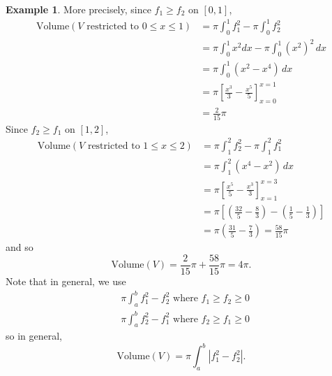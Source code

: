 \documentclass[11pt]{article}
\theoremstyle{definition}
\newtheorem{exmp}[thm]{Example}
\begin{document}
\begin{exmp}
More precisely, since $f_1 \geq f_2$ on $[0, 1]$,
\begin{align*}
\text{Volume}(V \text{ restricted to } 0 \leq x \leq 1) & = \pi \int_0^1 f_1^2 - \pi \int_0^1 f_2^2 \\
& = \pi \int_0^1 x^2dx - \pi \int_0^1 (x^2)^2\,dx \\
& = \pi \int_0^1 (x^2 - x^4)\,dx \\
& = \pi \left[ \frac{x^3}3 - \frac{x^5}5\right]_{x=0}^{x=1} \\
& = \frac{2}{15}\pi
\end{align*}
Since $f_2 \geq f_1$ on $[1, 2]$,
\begin{align*}
\text{Volume}(V \text{ restricted to } 1 \leq x \leq 2) & = \pi \int_1^2 f_2^2 - \pi \int_1^2 f_1^2 \\
& = \pi \int_1^2 (x^4 - x^2)\,dx \\
& = \pi \left[\frac{x^5}5 - \frac{x^3}3\right]_{x=1}^{x=3} \\
& = \pi \left[\left(\frac{32}5 - \frac83\right) - \left(\frac15 - \frac13\right)\right] \\
& = \pi \left(\frac{31}5 - \frac73\right) = \frac{58}{15}\pi
\end{align*}
and so
$$\text{Volume}(V) = \frac{2}{15}\pi + \frac{58}{15}\pi = 4\pi \text{.}$$
Note that in general, we use
\begin{align*}
& \pi \int_a^b f_1^2 - f_2^2 \text{ where } f_1 \geq f_2 \geq 0 \\
& \pi \int_a^b f_2^2 - f_1^2 \text{ where } f_2 \geq f_1 \geq 0 
\end{align*}
so in general, 
$$\text{Volume}(V) = \pi \int_a^b \left|f_1^2 - f_2^2\right| \text{.}$$
\end{exmp}
\end{document}
